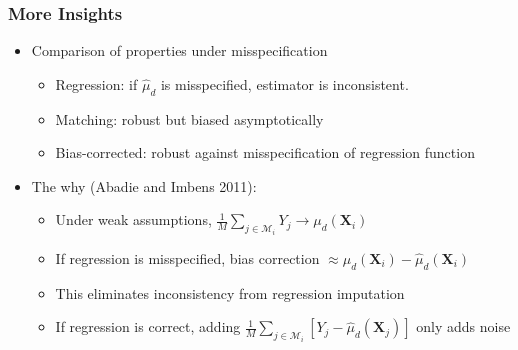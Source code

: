 \documentclass[10pt, handout]{beamer}
\begin{document}
\begin{frame}
  \frametitle{More Insights}

  \begin{itemize}
    \item Comparison of properties under misspecification
    \begin{itemize}
      \item Regression: if $\hat{\mu}_d$ is misspecified, estimator is inconsistent.
      \item Matching: robust but biased asymptotically
      \item Bias-corrected: robust against misspecification of regression function
    \end{itemize}
    \item The why (Abadie and Imbens 2011):
    \begin{itemize}
      \item Under weak assumptions, $\frac{1}{M} \sum_{j \in \mathcal{M}_i} Y_j \to \mu_d(\mathbf{X}_i)$
      \item If regression is misspecified, bias correction $\approx \mu_d(\mathbf{X}_i) - \hat{\mu}_d (\mathbf{X}_i)$
      \item This eliminates inconsistency from regression imputation
      \item If regression is correct, adding $\frac{1}{M} \sum_{j \in \mathcal{M}_i} \left[ Y_j - \hat{\mu}_d(\mathbf{X}_j) \right]$ only adds noise
    \end{itemize}
  \end{itemize}

\end{frame}
\end{document}
